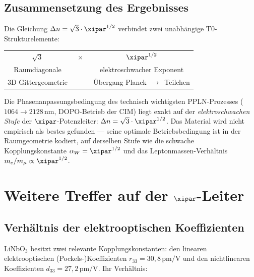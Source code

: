 \subsection{Zusammensetzung des Ergebnisses}

Die Gleichung $\Delta n = \sqrt{3}\cdot\xipar^{1/2}$ verbindet zwei
unabhängige T0-Strukturelemente:

\begin{center}
\renewcommand{\arraystretch}{1.5}
\begin{tabular}{ccc}
    $\sqrt{3}$ & $\;\times\;$ & $\xipar^{1/2}$ \\[2pt]
    Raumdiagonale & & elektroschwacher Exponent \\
    3D-Gittergeometrie & & Übergang Planck~$\to$~Teilchen \\
\end{tabular}
\end{center}

\begin{important}
Die Phasenanpassungsbedingung des technisch wichtigsten PPLN-Prozesses
($1064 \to 2128\,\text{nm}$, DOPO-Betrieb der CIM) liegt exakt auf der
\emph{elektroschwachen Stufe} der $\xipar$-Potenzleiter:
$\Delta n = \sqrt{3}\cdot\xipar^{1/2}$. Das Material wird nicht empirisch
als bestes gefunden — seine optimale Betriebsbedingung ist in der
Raumgeometrie kodiert, auf derselben Stufe wie die schwache
Kopplungskonstante $\alpha_W = \xipar^{1/2}$ und das Leptonmassen-Verhältnis
$m_e/m_\mu \propto \xipar^{1/2}$.
\end{important}

\clearpage

\section{Weitere Treffer auf der \texorpdfstring{$\xipar$}{xi}-Leiter}
\label{sec:weitere}

\subsection{Verhältnis der elektrooptischen Koeffizienten}

LiNbO$_3$ besitzt zwei relevante Kopplungskonstanten: den linearen
elektrooptischen (Pockels-)Koeffizienten $r_{33} = 30{,}8\,\text{pm/V}$
und den nichtlinearen Koeffizienten $d_{33} = 27{,}2\,\text{pm/V}$.
Ihr Verhältnis:

